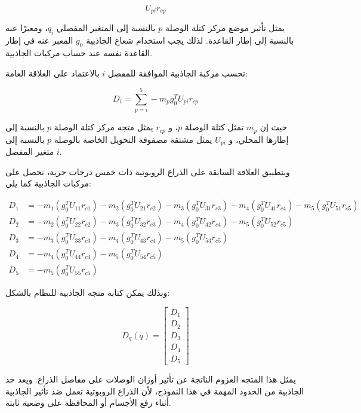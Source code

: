 \[
U_{pi}r_{cp}
\]

يمثل تأثير موضع مركز كتلة الوصلة $p$ بالنسبة إلى المتغير المفصلي $q_i$، ومعبرًا عنه بالنسبة إلى إطار القاعدة. لذلك يجب استخدام شعاع الجاذبية $g_0$ المعبر عنه في إطار القاعدة نفسه عند حساب مركبات الجاذبية.

تحسب مركبة الجاذبية الموافقة للمفصل $i$ بالاعتماد على العلاقة العامة:

\[
D_i =
\sum_{p=i}^{5}
- m_p g_0^{T} U_{pi} r_{cp}
\]

حيث إن $m_p$ تمثل كتلة الوصلة $p$، و $r_{cp}$ يمثل متجه مركز كتلة الوصلة $p$ بالنسبة إلى إطارها المحلي، و $U_{pi}$ يمثل مشتقة مصفوفة التحويل الخاصة بالوصلة $p$ بالنسبة إلى متغير المفصل $i$.

وبتطبيق العلاقة السابقة على الذراع الروبوتية ذات خمس درجات حرية، نحصل على مركبات الجاذبية كما يلي:

\begin{align*}
D_1 &=
- m_1 \left(g_0^{T} U_{11} r_{c1}\right)
- m_2 \left(g_0^{T} U_{21} r_{c2}\right)
- m_3 \left(g_0^{T} U_{31} r_{c3}\right)
- m_4 \left(g_0^{T} U_{41} r_{c4}\right)
- m_5 \left(g_0^{T} U_{51} r_{c5}\right)
\\[0.2cm]
D_2 &=
- m_2 \left(g_0^{T} U_{22} r_{c2}\right)
- m_3 \left(g_0^{T} U_{32} r_{c3}\right)
- m_4 \left(g_0^{T} U_{42} r_{c4}\right)
- m_5 \left(g_0^{T} U_{52} r_{c5}\right)
\\[0.2cm]
D_3 &=
- m_3 \left(g_0^{T} U_{33} r_{c3}\right)
- m_4 \left(g_0^{T} U_{43} r_{c4}\right)
- m_5 \left(g_0^{T} U_{53} r_{c5}\right)
\\[0.2cm]
D_4 &=
- m_4 \left(g_0^{T} U_{44} r_{c4}\right)
- m_5 \left(g_0^{T} U_{54} r_{c5}\right)
\\[0.2cm]
D_5 &=
- m_5 \left(g_0^{T} U_{55} r_{c5}\right)
\end{align*}

وبذلك يمكن كتابة متجه الجاذبية للنظام بالشكل:

\[
D_g(q)=
\begin{bmatrix}
D_1 \\
D_2 \\
D_3 \\
D_4 \\
D_5
\end{bmatrix}
\]

يمثل هذا المتجه العزوم الناتجة عن تأثير أوزان الوصلات على مفاصل الذراع. ويعد حد الجاذبية من الحدود المهمة في هذا النموذج، لأن الذراع الروبوتية تعمل ضد تأثير الجاذبية أثناء رفع الأجسام أو المحافظة على وضعية ثابتة.






















